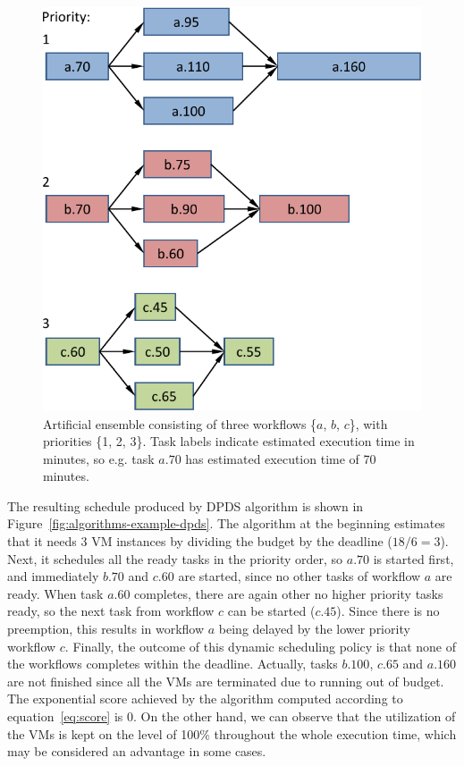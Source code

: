 \documentclass[preprint,5p]{elsarticle}
\begin{document}
\begin{figure}[htb] 
  \centering
  \includegraphics[width=0.80\columnwidth]{figures/example-ensemble}
  \caption{Artificial ensemble consisting of three workflows \{$a$, $b$, $c$\}, with priorities \{1, 2, 3\}.
  Task labels indicate estimated execution time in minutes, 
  so e.g. task $a.70$ has estimated execution time of 70 minutes.}
  \label{fig:example-ensemble}
\end{figure}

The resulting schedule produced by DPDS algorithm is shown in Figure~\ref{fig:algorithms-example-dpds}.
The algorithm at the beginning estimates that it needs 3 VM instances by dividing the budget by the deadline ($18 / 6 = 3$). 
Next, it schedules all the ready tasks in the priority order, so $a.70$ is started first, 
and immediately $b.70$ and $c.60$ are started, since no other tasks of workflow $a$ are ready. 
When task $a.60$ completes, there are again other no higher priority tasks ready, 
so the next task from workflow $c$ can be started ($c.45$). Since there is no preemption,
this results in workflow $a$ being delayed by the lower priority workflow $c$.
Finally, the outcome of this dynamic scheduling policy is that none of the workflows completes within the deadline.
Actually, tasks $b.100$, $c.65$ and $a.160$ are not finished since all the VMs 
are terminated due to running out of budget. 
The exponential score achieved by the algorithm computed according to equation~\ref{eq:score} is 0.
On the other hand, we can observe that the utilization of the VMs is kept on the level of 100\% throughout the 
whole execution time, which may be considered an advantage in some cases.
\end{document}
